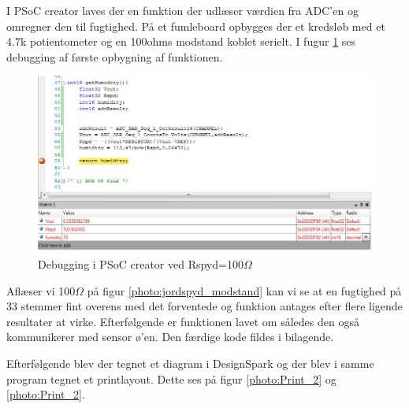 I PSoC creator laves der en funktion der udlæser værdien fra ADC'en og omregner den til fugtighed. På et fumleboard opbygges der et kredsløb med et 4.7k potientometer og en 100ohms modstand koblet serielt. I fugur \ref{photo:debug100} ses debugging af første opbygning af funktionen.

\begin{figure}[H]
	\centering 
	\includegraphics[scale=0.8]{HardwareArkitektur/Sensore/Jordfugt_billeder/debug100ohm.jpg}
	\caption{Debugging i PSoC creator ved Rspyd=100$\Omega$}
	\label{photo:debug100}
\end{figure} 

Aflæser vi 100$\Omega$ på figur \ref{photo:jordspyd_modstand} kan vi se at en fugtighed på 33 stemmer fint overens med det forventede og funktion antages efter flere ligende resultater at virke. Efterfølgende er funktionen lavet om således den også kommunikerer med sensor ø'en. Den færdige kode fildes i bilagende. 

Efterfølgende blev der tegnet et diagram i DesignSpark og der blev i samme program tegnet et printlayout. Dette ses på figur \ref{photo:Print_2} og \ref{photo:Print_2}.

